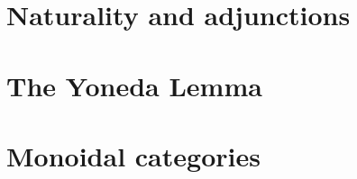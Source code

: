 \section{Naturality and adjunctions}
\label{sec:naturality}


\section{The Yoneda Lemma}
\label{sec:yoneda}


\section{Monoidal categories}
\label{sec:monoidal-cats}



